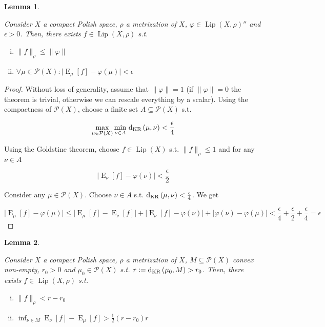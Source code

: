 \documentclass[11pt]{article}
\theoremstyle{definition}
\theoremstyle{plain}
\newtheorem{lemma}{Lemma}%
\newcommand{\A}[1]{\lvert #1 \rvert}
\newcommand{\N}[1]{\lVert #1 \rVert}
\DeclareMathOperator{\E}{E}
\newcommand{\PM}{\mathcal{P}}
\newcommand{\Lp}{{\operatorname{Lip}}}
\newcommand{\DKR}{\operatorname{d}_{\textnormal{KR}}}
\begin{document}
\begin{samepage}
\begin{lemma}
\label{lmm:double_dual}

Consider $X$ a compact Polish space, $\rho$ a metrization of $X$, $\varphi \in \Lp\left(X,\rho\right)''$ and $\epsilon > 0$. Then, there exists $f \in \Lp\left(X,\rho\right)$ s.t.

\begin{enumerate}[i.]

\item $\N{f}_\rho \leq \N{\varphi}$
\item $\forall \mu \in \PM\left(X\right): \A{\E_\mu[f] - \varphi\left(\mu\right)} < \epsilon$

\end{enumerate}

\end{lemma}
\end{samepage}

\begin{proof}

Without loss of generality, assume that $\N{\varphi}=1$ (if $\N{\varphi}=0$ the theorem is trivial, otherwise we can rescale everything by a scalar). Using the compactness of $\PM\left(X\right)$, choose a finite set $A \subseteq \PM\left(X\right)$ s.t. 

$$\max_{\mu \in \PM\left(X\right)} \min_{\nu \in A}\, \DKR\left(\mu,\nu\right) < \frac{\epsilon}{4}$$

Using the Goldstine theorem, choose $f \in \Lp\left(X\right)$ s.t. $\N{f}_\rho \leq 1$ and for any $\nu \in A$ 

$$\A{\E_\nu[f] - \varphi\left(\nu\right)} < \frac{\epsilon}{2}$$

Consider any $\mu \in \PM\left(X\right)$. Choose $\nu \in A$ s.t. $\DKR\left(\mu,\nu\right) < \frac{\epsilon}{4}$. We get

$$\A{\E_\mu[f] - \varphi\left(\mu\right)} \leq \A{\E_\mu[f] - \E_\nu[f]} + \A{\E_\nu[f] - \varphi\left(\nu\right)} + \A{\varphi\left(\nu\right) - \varphi\left(\mu\right)} < \frac{\epsilon}{4} + \frac{\epsilon}{2} + \frac{\epsilon}{4} = \epsilon$$
\end{proof}

\begin{samepage}
\begin{lemma}
\label{lmm:separation}

Consider $X$ a compact Polish space, $\rho$ a metrization of $X$, $M \subseteq \PM\left(X\right)$ convex non-empty, $r_0 > 0$ and $\mu_0 \in \PM\left(X\right)$ s.t. $r:=\DKR\left(\mu_0,M\right) > r_0$. Then, there exists $f \in \Lp\left(X,\rho\right)$ s.t.

\begin{enumerate}[i.]

\item $\N{f}_\rho < r - r_0$
\item $\inf_{\nu \in M} \E_\nu[f] - \E_\mu[f] > \frac{1}{2}\left(r-r_0\right)r$

\end{enumerate}

\end{lemma}
\end{samepage}
\end{document}
